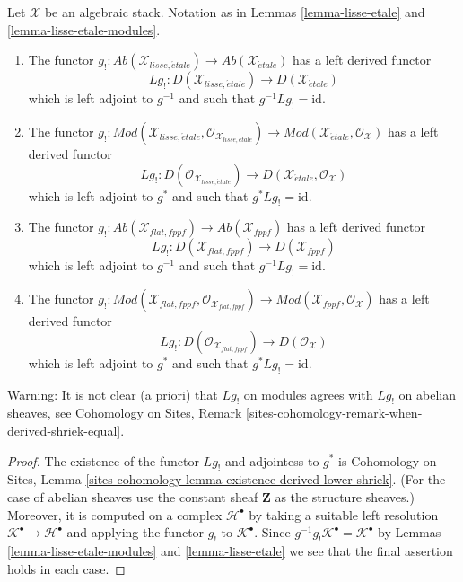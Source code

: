 \begin{lemma}
\label{lemma-shriek-derived}
Let $\mathcal{X}$ be an algebraic stack.
Notation as in Lemmas \ref{lemma-lisse-etale} and
\ref{lemma-lisse-etale-modules}.
\begin{enumerate}
\item The functor
$g_! : \textit{Ab}(\mathcal{X}_{lisse,\acute{e}tale}) \to
\textit{Ab}(\mathcal{X}_{\acute{e}tale})$
has a left derived functor
$$
Lg_! :
D(\mathcal{X}_{lisse,\acute{e}tale})
\longrightarrow
D(\mathcal{X}_{\acute{e}tale})
$$
which is left adjoint to $g^{-1}$ and such that $g^{-1}Lg_! = \text{id}$.
\item The functor $g_! : 
\textit{Mod}(\mathcal{X}_{lisse,\acute{e}tale},
\mathcal{O}_{\mathcal{X}_{lisse,\acute{e}tale}}) \to
\textit{Mod}(\mathcal{X}_{\acute{e}tale}, \mathcal{O}_{\mathcal{X}})$
has a left derived functor
$$
Lg_! :
D(\mathcal{O}_{\mathcal{X}_{lisse,\acute{e}tale}})
\longrightarrow
D(\mathcal{X}_{\acute{e}tale}, \mathcal{O}_\mathcal{X})
$$
which is left adjoint to $g^*$ and such that $g^*Lg_! = \text{id}$.
\item The functor $g_! : \textit{Ab}(\mathcal{X}_{flat,fppf}) \to
\textit{Ab}(\mathcal{X}_{fppf})$
has a left derived functor
$$
Lg_! :
D(\mathcal{X}_{flat, fppf})
\longrightarrow
D(\mathcal{X}_{fppf})
$$
which is left adjoint to $g^{-1}$ and such that $g^{-1}Lg_! = \text{id}$.
\item The functor $g_! :
\textit{Mod}(\mathcal{X}_{flat,fppf},
\mathcal{O}_{\mathcal{X}_{flat,fppf}}) \to
\textit{Mod}(\mathcal{X}_{fppf}, \mathcal{O}_{\mathcal{X}})$
has a left derived functor
$$
Lg_! :
D(\mathcal{O}_{\mathcal{X}_{flat, fppf}})
\longrightarrow
D(\mathcal{O}_\mathcal{X})
$$
which is left adjoint to $g^*$ and such that $g^*Lg_! = \text{id}$.
\end{enumerate}
Warning: It is not clear (a priori) that $Lg_!$ on modules agrees
with $Lg_!$ on abelian sheaves, see
Cohomology on Sites, Remark
\ref{sites-cohomology-remark-when-derived-shriek-equal}.
\end{lemma}

\begin{proof}
The existence of the functor $Lg_!$ and adjointess to $g^*$ is
Cohomology on Sites, Lemma
\ref{sites-cohomology-lemma-existence-derived-lower-shriek}.
(For the case of abelian sheaves use the constant sheaf $\mathbf{Z}$
as the structure sheaves.)
Moreover, it is computed on a complex $\mathcal{H}^\bullet$
by taking a suitable left resolution
$\mathcal{K}^\bullet \to \mathcal{H}^\bullet$
and applying the functor $g_!$ to $\mathcal{K}^\bullet$.
Since $g^{-1}g_!\mathcal{K}^\bullet = \mathcal{K}^\bullet$ by
Lemmas \ref{lemma-lisse-etale-modules} and
\ref{lemma-lisse-etale}
we see that the final assertion holds in each case.
\end{proof}

